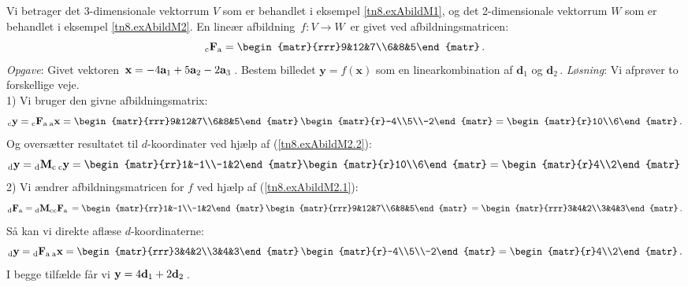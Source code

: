 \begin{example}%
Vi betrager det 3-dimensionale vektorrum $V$ som er behandlet i eksempel \ref{tn8.exAbildM1}, og det 2-dimensionale vektorrum $W$ som er behandlet i eksempel \ref{tn8.exAbildM2}. En lineær afbildning $\,f:V\rightarrow W\,$ er givet ved afbildningsmatricen:
$$
\matind cFa=\begin{matr}{rrr}9&12&7\\6&8&5\end{matr}\,.
$$
\textit{Opgave}: Givet vektoren $\,\mathbf x=-4\mathbf{a}_1+5\mathbf{a}_2-2\mathbf{a}_3\,$. Bestem billedet $\mathbf y=f(\mathbf x)$ som en linearkombination af $\mathbf d_1$ og $\mathbf d_2\,$. \bs
\textit{Løsning}: Vi afprøver to forskellige veje.\\
1) Vi bruger den givne afbildningsmatrix:
$$\vekind cy=\matind cFa\,\vekind ax=
\begin{matr}{rrr}9&12&7\\6&8&5\end{matr}\,\begin{matr}{r}-4\\5\\-2\end{matr}
=\begin{matr}{r}10\\6\end{matr}\,.$$
Og oversætter resultatet til $d$-koordinater ved hjælp af (\ref{tn8.exAbildM2.2}):
$$\vekind dy=\matind dMc\,\vekind cy = 
\begin{matr}{rr}1&-1\\-1&2\end{matr} \begin{matr}{r}10\\6\end{matr}
=\begin{matr}{r}4\\2\end{matr}\,$$
2) Vi ændrer afbildningsmatricen for $f$ ved hjælp af (\ref{tn8.exAbildM2.1}):
$$
\matind dFa=\matind dMc\matind cFa\, =
\begin{matr}{rr}1&-1\\-1&2\end{matr}\,
\begin{matr}{rrr}9&12&7\\6&8&5\end{matr}\,
=\begin{matr}{rrr}3&4&2\\3&4&3\end{matr}\,.
$$
Så kan vi direkte aflæse $d$-koordinaterne:
$$\vekind dy=\matind dFa\,\vekind ax=
\begin{matr}{rrr}3&4&2\\3&4&3\end{matr}\,\begin{matr}{r}-4\\5\\-2\end{matr}
=\begin{matr}{r}4\\2\end{matr}\,.$$
I begge tilfælde får vi $\mathbf y = 4\mathbf{d}_1+2\mathbf{d}_2\,$.
\end{example}

